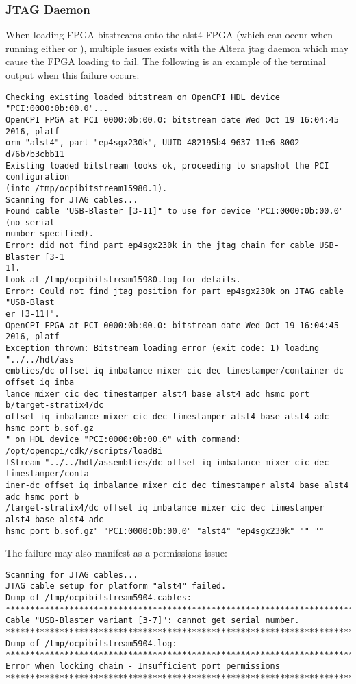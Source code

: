 \subsubsection*{JTAG Daemon}
When loading FPGA bitstreams onto the alst4 FPGA (which can occur when running either  or ), multiple issues exists with the Altera jtag daemon which may cause the FPGA loading to fail. The following is an example of the terminal output when this failure occurs:
\begin{lstlisting}
Checking existing loaded bitstream on OpenCPI HDL device "PCI:0000:0b:00.0"...
OpenCPI FPGA at PCI 0000:0b:00.0: bitstream date Wed Oct 19 16:04:45 2016, platf
orm "alst4", part "ep4sgx230k", UUID 482195b4-9637-11e6-8002-d76b7b3cbb11
Existing loaded bitstream looks ok, proceeding to snapshot the PCI configuration
(into /tmp/ocpibitstream15980.1).
Scanning for JTAG cables...
Found cable "USB-Blaster [3-11]" to use for device "PCI:0000:0b:00.0" (no serial
number specified).
Error: did not find part ep4sgx230k in the jtag chain for cable USB-Blaster [3-1
1].
Look at /tmp/ocpibitstream15980.log for details.
Error: Could not find jtag position for part ep4sgx230k on JTAG cable "USB-Blast
er [3-11]".
OpenCPI FPGA at PCI 0000:0b:00.0: bitstream date Wed Oct 19 16:04:45 2016, platf
Exception thrown: Bitstream loading error (exit code: 1) loading "../../hdl/ass
emblies/dc offset iq imbalance mixer cic dec timestamper/container-dc offset iq imba
lance mixer cic dec timestamper alst4 base alst4 adc hsmc port b/target-stratix4/dc
offset iq imbalance mixer cic dec timestamper alst4 base alst4 adc hsmc port b.sof.gz
" on HDL device "PCI:0000:0b:00.0" with command: /opt/opencpi/cdk//scripts/loadBi
tStream "../../hdl/assemblies/dc offset iq imbalance mixer cic dec timestamper/conta
iner-dc offset iq imbalance mixer cic dec timestamper alst4 base alst4 adc hsmc port b
/target-stratix4/dc offset iq imbalance mixer cic dec timestamper alst4 base alst4 adc
hsmc port b.sof.gz" "PCI:0000:0b:00.0" "alst4" "ep4sgx230k" "" ""
\end{lstlisting}
The failure may also manifest as a permissions issue:
\begin{lstlisting}
Scanning for JTAG cables...
JTAG cable setup for platform "alst4" failed.
Dump of /tmp/ocpibitstream5904.cables:
********************************************************************************
Cable "USB-Blaster variant [3-7]": cannot get serial number.
********************************************************************************
Dump of /tmp/ocpibitstream5904.log:
********************************************************************************
Error when locking chain - Insufficient port permissions
********************************************************************************
\end{lstlisting}

